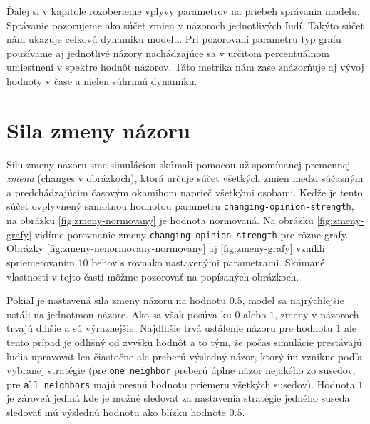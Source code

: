 \documentclass[10pt,a4paper]{report}
\begin{document}
Ďalej si v kapitole rozoberieme vplyvy parametrov na priebeh správania modelu. Správanie pozorujeme ako súčet zmien v názoroch jednotlivých ľudí. Takýto súčet nám ukazuje celkovú dynamiku modelu. Pri pozorovaní parametru typ grafu používame aj jednotlivé názory nachádzajúce sa v určitom percentuálnom umiestnení v spektre hodnôt názorov. Táto metrika nám zase znázorňuje aj vývoj hodnoty v čase a nielen súhrnnú dynamiku.

\section{Sila zmeny názoru}

Silu zmeny názoru sme simuláciou skúmali pomocou už spomínanej premennej \textit{zmena} (changes v obrázkoch), ktorá určuje súčet všetkých zmien medzi súčasným a predchádzajúcim časovým okamihom naprieč všetkými osobami. Keďže je tento súčet ovplyvnený samotnou hodnotou parametru \texttt{changing-opinion-strength}, na obrázku \ref{fig:zmeny-normovany} je hodnota normovaná. Na obrázku \ref{fig:zmeny-grafy} vidíme porovnanie zmeny \texttt{changing-opinion-strength} pre rôzne grafy. Obrázky \ref{fig:zmeny-nenormovany-normovany} aj \ref{fig:zmeny-grafy} vznikli spriemerovaním $10$ behov s rovnako nastavenými parametrami. Skúmané vlastnosti v tejto časti môžme pozorovať na popísaných obrázkoch.  

Pokiaľ je nastavená sila zmeny názoru na hodnotu $0.5$, model sa najrýchlejšie ustáli na jednotmon názore. Ako sa však posúva ku $0$ alebo $1$, zmeny v názoroch trvajú dlhšie a sú výraznejšie. Najdlhšie trvá ustálenie názoru pre hodnotu $1$ ale tento prípad je odlišný od zvyšku hodnôt a to tým, že počas simulácie prestávajú ľudia upravovať len čiastočne ale preberú výsledný názor, ktorý im vznikne podľa vybranej stratégie (pre \texttt{one neighbor} preberú úplne názor nejakého zo susedov, pre \texttt{all neighbors} majú presnú hodnotu priemeru všetkých susedov). Hodnota $1$ je zároveň jediná kde je možné sledovať za nastavenia stratégie jedného suseda sledovať inú výslednú hodnotu ako blízku hodnote $0.5$.
\end{document}

